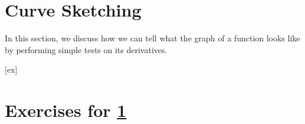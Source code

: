 \section{Curve Sketching}\label{sec:CurveSketching}

In this section, we discuss how we can tell what the graph of a function
looks like by performing simple tests on its derivatives.









[ex]
\section*{Exercises for \ref{sec:CurveSketching}}

